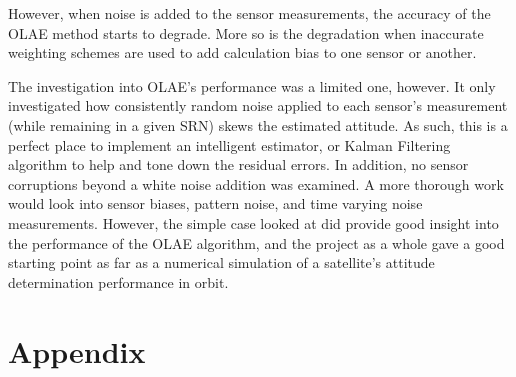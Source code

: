 \documentclass[11pt]{aiaa-tc}%
\begin{document}
However, when noise is added to the sensor measurements, the accuracy of the OLAE method starts to degrade. More so is the degradation when inaccurate weighting schemes are used to add calculation bias to one sensor or another. 

The investigation into OLAE's performance was a limited one, however. It only investigated how consistently random noise applied to each sensor's measurement (while remaining in a given SRN) skews the estimated attitude. As such, this is a perfect place to implement an intelligent estimator, or Kalman Filtering algorithm to help and tone down the residual errors. In addition, no sensor corruptions beyond a white noise addition was examined. A more thorough work would look into sensor biases, pattern noise, and time varying noise measurements. However, the simple case looked at did provide good insight into the performance of the OLAE algorithm, and the project as a whole gave a good starting point as far as a numerical simulation of a satellite's attitude determination performance in orbit. 

\newpage







\newpage
\section{Appendix}
\label{APP:Code}
\end{document}
